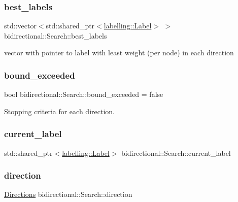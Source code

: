 \subsubsection{\texorpdfstring{best\+\_\+labels}{best\_labels}}
{\footnotesize\ttfamily std\+::vector$<$std\+::shared\+\_\+ptr$<$\hyperlink{classlabelling_1_1Label}{labelling\+::\+Label}$>$ $>$ bidirectional\+::\+Search\+::best\+\_\+labels}

vector with pointer to label with least weight (per node) in each direction \mbox{\label{classbidirectional_1_1Search_a51f9dea11b07ce6e196df86ce0912d7d}} 
\subsubsection{\texorpdfstring{bound\+\_\+exceeded}{bound\_exceeded}}
{\footnotesize\ttfamily bool bidirectional\+::\+Search\+::bound\+\_\+exceeded = false}



Stopping criteria for each direction. 

\mbox{\label{classbidirectional_1_1Search_a3c1bc6eaad5e1dfe7d8181b4c34db1bd}} 
\subsubsection{\texorpdfstring{current\+\_\+label}{current\_label}}
{\footnotesize\ttfamily std\+::shared\+\_\+ptr$<$\hyperlink{classlabelling_1_1Label}{labelling\+::\+Label}$>$ bidirectional\+::\+Search\+::current\+\_\+label}

\mbox{\label{classbidirectional_1_1Search_ad5a262892bdeae2978453c9967ab7372}} 
\subsubsection{\texorpdfstring{direction}{direction}}
{\footnotesize\ttfamily \hyperlink{namespacebidirectional_a4cbe6f0bfbd3629c2cd44c98014aed70}{Directions} bidirectional\+::\+Search\+::direction}



